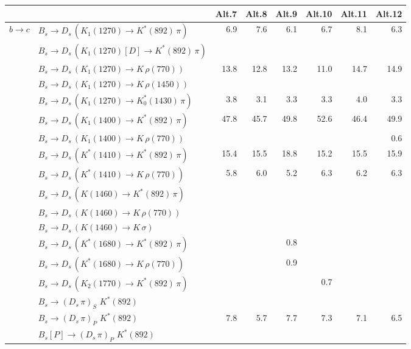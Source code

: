 \begin{tabular}{l l  r  r  r  r  r  r  } 
\hline
\hline
&  & \multicolumn{1}{c}{Alt.7}  & \multicolumn{1}{c}{Alt.8}  & \multicolumn{1}{c}{Alt.9}  & \multicolumn{1}{c}{Alt.10}  & \multicolumn{1}{c}{Alt.11}  & \multicolumn{1}{c}{Alt.12}  \\ 
\hline
\multirow{30}{*}{$b \to c$}  & $B_s \to D_s \, ( K_1(1270) \to K^{*}(892) \, \pi )$ & 6.9 & 7.6 & 6.1 & 6.7 & 8.1 & 6.3 \\ 
 & $B_s \to D_s \, ( K_1(1270)[D] \to K^{*}(892) \, \pi )$ &  &  &  &  &  &  \\ 
 & $B_s \to D_s \, ( K_1(1270) \to K \, \rho(770) )$ & 13.8 & 12.8 & 13.2 & 11.0 & 14.7 & 14.9 \\ 
 & $B_s \to D_s \, ( K_1(1270) \to K \, \rho(1450) )$ &  &  &  &  &  &  \\ 
 & $B_s \to D_s \, ( K_1(1270) \to K^{*}_{0}(1430) \, \pi )$ & 3.8 & 3.1 & 3.3 & 3.3 & 4.0 & 3.3 \\ 
 & $B_s \to D_s \, ( K_1(1400) \to K^{*}(892) \, \pi )$ & 47.8 & 45.7 & 49.8 & 52.6 & 46.4 & 49.9 \\ 
 & $B_s \to D_s \, ( K_1(1400) \to K \, \rho(770) )$ &  &  &  &  &  & 0.6 \\ 
 & $B_s \to D_s \, ( K^{*}(1410) \to K^{*}(892) \, \pi )$ & 15.4 & 15.5 & 18.8 & 15.2 & 15.5 & 15.9 \\ 
 & $B_s \to D_s \, ( K^{*}(1410) \to K \, \rho(770) )$ & 5.8 & 6.0 & 5.2 & 6.3 & 6.2 & 6.3 \\ 
 & $B_s \to D_s \, ( K(1460) \to K^{*}(892) \, \pi )$ &  &  &  &  &  &  \\ 
 & $B_s \to D_s \, ( K(1460) \to K \, \rho(770) )$ &  &  &  &  &  &  \\ 
 & $B_s \to D_s \, ( K(1460) \to K \, \sigma )$ &  &  &  &  &  &  \\ 
 & $B_s \to D_s \, ( K^{*}(1680) \to K^{*}(892) \, \pi )$ &  &  & 0.8 &  &  &  \\ 
 & $B_s \to D_s \, ( K^{*}(1680) \to K \, \rho(770) )$ &  &  & 0.9 &  &  &  \\ 
 & $B_s \to D_s \, ( K_2(1770) \to K^{*}(892) \, \pi )$ &  &  &  & 0.7 &  &  \\ 
 & $B_s \to ( D_s \, \pi)_{S} \, \, K^{*}(892)$ &  &  &  &  &  &  \\ 
 & $B_s \to ( D_s \, \pi)_{P} \, \, K^{*}(892)$ & 7.8 & 5.7 & 7.7 & 7.3 & 7.1 & 6.5 \\ 
 & $B_s[P] \to ( D_s \, \pi)_{P} \, \, K^{*}(892)$ &  &  &  &  &  &  \\ 

\end{tabular}
